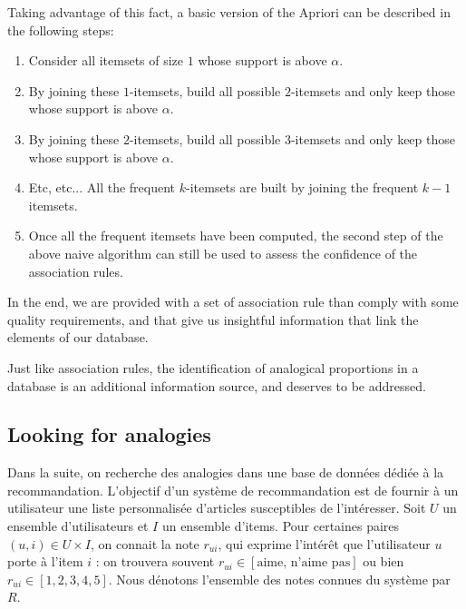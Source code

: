 Taking advantage of this fact, a basic version of the Apriori can be described
in the following steps:
\begin{enumerate}
  \item Consider all itemsets of size $1$ whose support is above $\alpha$.
  \item By joining these $1$-itemsets, build all possible $2$-itemsets and only
    keep those whose support is above $\alpha$.
  \item By joining these $2$-itemsets, build all possible $3$-itemsets and only
    keep those whose support is above $\alpha$.
  \item Etc, etc... All the frequent $k$-itemsets are built by joining the
    frequent $k-1$ itemsets.
  \item Once all the frequent itemsets have been computed, the second step of
    the above naive algorithm can still be used to assess the confidence of the
    association rules.
\end{enumerate}

In the end, we are provided with a set of association rule than comply with
some quality requirements, and that give us insightful information that link
the elements of our database.


Just like association rules, the identification of analogical proportions in a
database is an additional information source, and deserves to be addressed.


\subsection{Looking for analogies}


Dans la suite, on recherche des analogies dans une base de données dédiée à la
recommandation.
L'objectif d'un système de recommandation est de fournir à un utilisateur une
liste personnalisée d'articles susceptibles de l'intéresser.  Soit $U$ un
ensemble d'utilisateurs et $I$ un ensemble d'items. Pour certaines paires $(u,
i) \in U \times I$, on connait la note $r_{ui}$, qui exprime l'intérêt que
l'utilisateur $u$ porte à l'item $i$ : on trouvera souvent $r_{ui} \in
[\text{aime, n'aime pas}]$ ou bien $r_{ui} \in [1, 2, 3, 4, 5]$. Nous dénotons l'ensemble des notes
connues du système par $R$.

